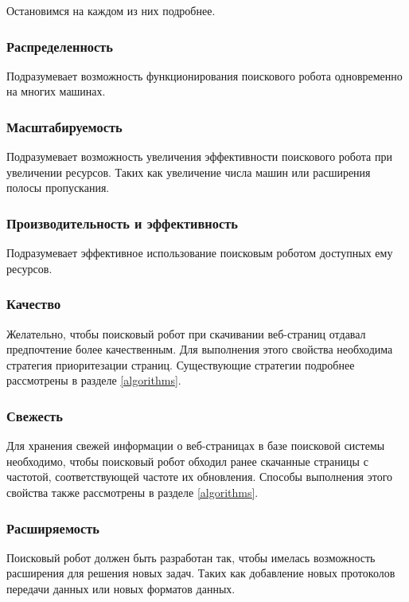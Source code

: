 Остановимся на каждом из них подробнее.

\subsubsection*{Распределенность}

Подразумевает возможность функционирования поискового робота одновременно на многих машинах.

\subsubsection*{Масштабируемость}

Подразумевает возможность увеличения эффективности поискового робота при увеличении ресурсов. Таких как увеличение числа машин или расширения полосы пропускания.

\subsubsection*{Производительность и эффективность}

Подразумевает эффективное использование поисковым роботом доступных ему ресурсов. 

\subsubsection*{Качество}

Желательно, чтобы поисковый робот при скачивании веб-страниц отдавал предпочтение более качественным. Для выполнения этого свойства необходима стратегия приоритезации страниц. Существующие стратегии подробнее рассмотрены в разделе \ref{algorithms}.

\subsubsection*{Свежесть}

Для хранения свежей информации о веб-страницах в базе поисковой системы необходимо, чтобы поисковый робот обходил ранее скачанные страницы с частотой, соответствующей частоте их обновления. Способы выполнения этого свойства также рассмотрены в разделе \ref{algorithms}.

\subsubsection*{Расширяемость}

Поисковый робот должен быть разработан так, чтобы имелась возможность расширения для решения новых задач. Таких как добавление новых протоколов передачи данных или новых форматов данных. 

